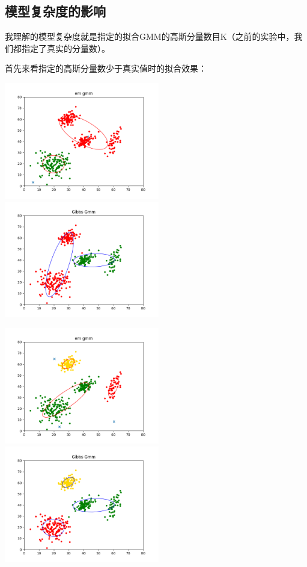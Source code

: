 \documentclass[hyperref,UTF8]{ctexart}
\begin{document}
\subsection*{模型复杂度的影响}
\par 我理解的模型复杂度就是指定的拟合GMM的高斯分量数目K（之前的实验中，我们都指定了真实的分量数）。
\par 首先来看指定的高斯分量数少于真实值时的拟合效果：\\
\centerline{\includegraphics[height=2in]{exp-results/EM-2K.png}\includegraphics[height=2in]{exp-results/Gibbs-2K.png}}
\centerline{\includegraphics[height=2in]{exp-results/EM-3K.png}\includegraphics[height=2in]{exp-results/Gibbs-3K.png}}
\end{document}
